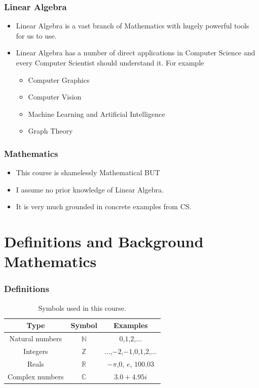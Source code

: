\documentclass[hyperref={colorlinks=true},xcolor=svgnames]{beamer}
\begin{document}
\begin{frame}
\frametitle{Linear Algebra}

\begin{itemize}
\item Linear Algebra is a vast branch of Mathematics with hugely powerful tools for us to use. 

\item Linear Algebra has a number of direct applications in Computer Science and every Computer Scientist should understand it. For example
\pause
\begin{itemize}
\item Computer Graphics
\item Computer Vision
\item Machine Learning and Artificial Intelligence
\item Graph Theory
\end{itemize}
\end{itemize}

\end{frame}

\begin{frame}
\frametitle{Mathematics}
\begin{itemize}
\item This course is shamelessly Mathematical BUT

\pause

\item I assume no prior knowledge of Linear Algebra.

\item It is very much grounded in concrete examples from CS. 
\end{itemize}


\end{frame}
\section{Definitions and Background Mathematics}

\begin{frame}
\frametitle{Definitions}

\begin{table}[htdp]

\begin{center}
\begin{tabular}{|c|c|c|}
\hline 
Type & Symbol & Examples \\ \hline
Natural numbers & $\mathbb{N}$ & $0$,$1$,$2$,$\dots$ \\ 
Integers & $\mathbb{Z}$ & $\dots$,$-2$,$-1$,$0$,$1$,$2$,$\dots$ \\ 
Reals & $\mathbb{R}$ & $-\pi$,$0$, $e$, $100.03$ \\
Complex numbers & $\mathbb{C}$ &$3.0 + 4.95 i$ \\ \hline 
\end{tabular}
\end{center}
\caption{Symbols used in this course.}
\label{Symbols}
\end{table}%


\end{frame} 
\end{document}
